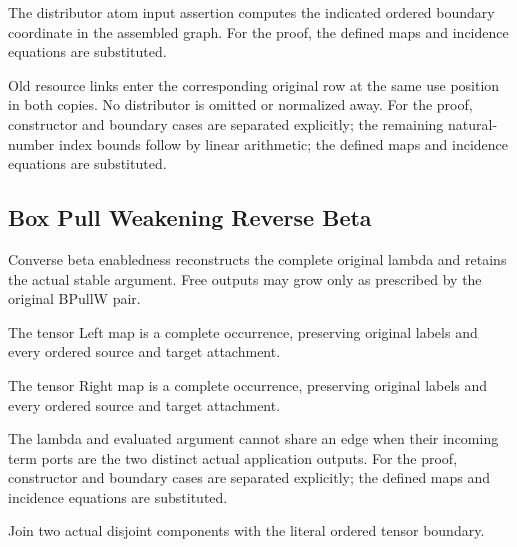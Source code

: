 The distributor atom input assertion computes the indicated ordered boundary coordinate in the assembled graph.
For the proof, the defined maps and incidence equations are substituted.
\par{}

Old resource links enter the corresponding original row at the same use position in both copies. No distributor is omitted or normalized away.
For the proof, constructor and boundary cases are separated explicitly; the remaining natural-number index bounds follow by linear arithmetic; the defined maps and incidence equations are substituted.
\par{}

\subsection{Box Pull Weakening Reverse Beta}
Converse beta enabledness reconstructs the complete original lambda and retains the actual stable argument. Free outputs may grow only as prescribed by the original BPullW pair.

The tensor Left map is a complete occurrence, preserving original labels and every ordered source and target attachment.
\par{}

The tensor Right map is a complete occurrence, preserving original labels and every ordered source and target attachment.
\par{}

The lambda and evaluated argument cannot share an edge when their incoming term ports are the two distinct actual application outputs.
For the proof, constructor and boundary cases are separated explicitly; the defined maps and incidence equations are substituted.
\par{}

Join two actual disjoint components with the literal ordered tensor boundary.
\par{}

